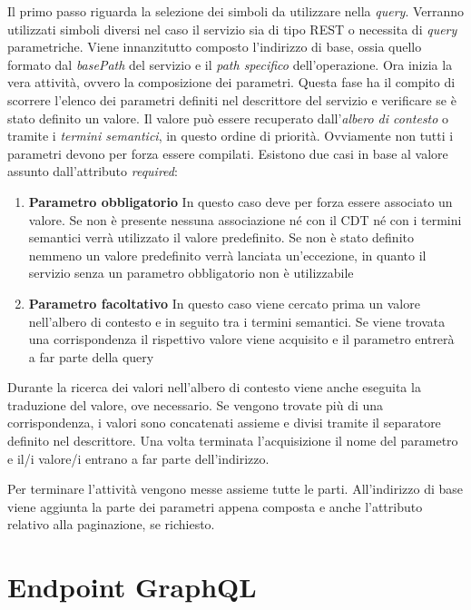 Il primo passo riguarda la selezione dei simboli da utilizzare nella \emph{query}. Verranno utilizzati simboli diversi nel caso il servizio sia di tipo REST o necessita di \emph{query} parametriche. Viene innanzitutto composto l'indirizzo di base, ossia quello formato dal \emph{basePath} del servizio e il \emph{path specifico} dell'operazione. Ora inizia la vera attività, ovvero la composizione dei parametri. Questa fase ha il compito di scorrere l'elenco dei parametri definiti nel descrittore del servizio e verificare se è stato definito un valore. Il valore può essere recuperato dall'\emph{albero di contesto} o tramite i \emph{termini semantici}, in questo ordine di priorità. Ovviamente non tutti i parametri devono per forza essere compilati. Esistono due casi in base al valore assunto dall'attributo \emph{required}:

\begin{enumerate}
	\item \textbf{Parametro obbligatorio}
	In questo caso deve per forza essere associato un valore. Se non è presente nessuna associazione né con il CDT né con i termini semantici verrà utilizzato il valore predefinito. Se non è stato definito nemmeno un valore predefinito verrà lanciata un'eccezione, in quanto il servizio senza un parametro obbligatorio non è utilizzabile
	\item \textbf{Parametro facoltativo}
	In questo caso viene cercato prima un valore nell'al\-be\-ro di contesto e in seguito tra i termini semantici. Se viene trovata una corrispondenza il rispettivo valore viene acquisito e il parametro entrerà a far parte della query
\end{enumerate}

Durante la ricerca dei valori nell'albero di contesto viene anche eseguita la traduzione del valore, ove necessario. Se vengono trovate più di una corrispondenza, i valori sono concatenati assieme e divisi tramite il separatore definito nel descrittore. Una volta terminata l'acquisizione il nome del parametro e il/i valore/i entrano a far parte dell'indirizzo.

Per terminare l'attività vengono messe assieme tutte le parti. All'indirizzo di base viene aggiunta la parte dei parametri appena composta e anche l'attributo relativo alla paginazione, se richiesto.

\section{Endpoint GraphQL\label{sec:endpoint-graphql}}

